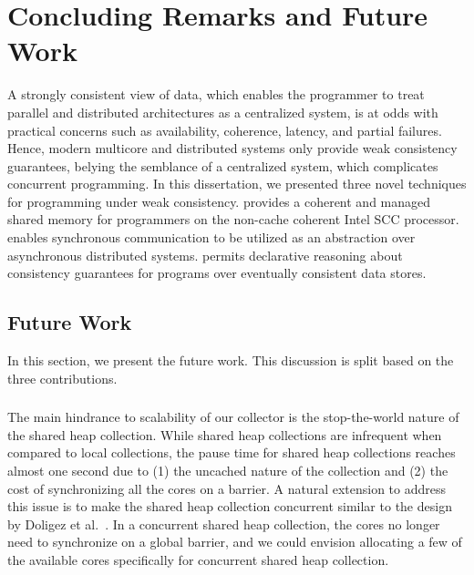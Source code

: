 \chapter{Concluding Remarks and Future Work}
\label{chap:conclusion}

A strongly consistent view of data, which enables the programmer to treat
parallel and distributed architectures as a centralized system, is at odds with
practical concerns such as availability, coherence, latency, and partial
failures. Hence, modern multicore and distributed systems only provide weak
consistency guarantees, belying the semblance of a centralized system, which
complicates concurrent programming. In this dissertation, we presented three
novel techniques for programming under weak consistency. \MMSCC provides a
coherent and managed shared memory for programmers on the non-cache coherent
Intel SCC processor. \rxcml enables synchronous communication to be utilized as
an abstraction over asynchronous distributed systems. \quelea permits
declarative reasoning about consistency guarantees for programs over eventually
consistent data stores.

\section{Future Work}

In this section, we present the future work. This discussion is split based on
the three contributions.

\subsection{\MMSCC}

The main hindrance to scalability of our \MMSCC collector is the stop-the-world
nature of the shared heap collection. While shared heap collections are
infrequent when compared to local collections, the pause time for shared heap
collections reaches almost one second due to (1) the uncached nature of the
collection and (2) the cost of synchronizing all the cores on a barrier. A
natural extension to address this issue is to make the shared heap collection
concurrent similar to the design by Doligez et al.~\cite{Doligez93}. In a
concurrent shared heap collection, the cores no longer need to synchronize on a
global barrier, and we could envision allocating a few of the available cores
specifically for concurrent shared heap collection.

